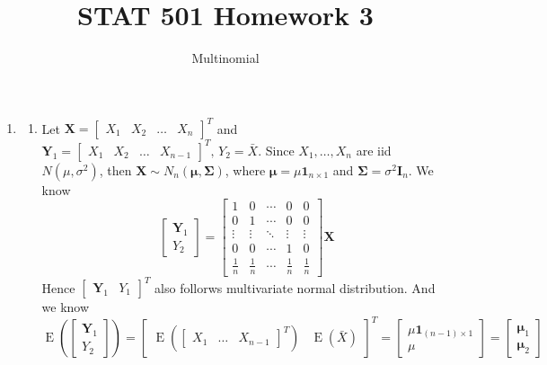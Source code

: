 \documentclass{article}
\DeclareMathOperator{\E}{E}
\begin{document}
	

	
	\title{STAT 501 Homework 3}
	\author{Multinomial}
	\maketitle
	
	\begin{enumerate}[leftmargin = 0 em, label = \arabic*., font = \bfseries]
	\item 
	\begin{enumerate}
		\item 
		Let $\bm X = \begin{bmatrix}
					X_1& X_2& \ldots & X_n
				\end{bmatrix}^T$ and $\bm Y_1 = \begin{bmatrix}
					X_1 & X_2 & \ldots & X_{n-1}
				\end{bmatrix}^T,\, Y_2 = \bar{X}$. Since $X_1, \ldots ,X_n$ are iid $N(\mu, \sigma^2)$, then $\bm X \sim N_n(\bm \mu, \bm \Sigma)$, where $\bm \mu = \mu \bm 1_{n\times 1}$ and $\bm \Sigma = \sigma^2 \bm I_n$. We know
				\[\begin{bmatrix}
					\bm Y_1\\
					Y_2
				\end{bmatrix} = \begin{bmatrix}
					1 & 0 & \cdots & 0 & 0\\
					0 & 1 & \cdots & 0 & 0 \\
					\vdots & \vdots & \ddots & \vdots & \vdots\\
					0 & 0 & \cdots & 1 & 0\\
					\frac{1}{n} & \frac{1}{n} & \cdots & \frac{1}{n} & \frac{1}{n}
				\end{bmatrix} \bm X\]
				Hence $\begin{bmatrix}
					\bm Y_1 & Y_1
				\end{bmatrix}^T$ also follorws multivariate normal distribution. And we know 
				\[\E\left(\begin{bmatrix}
					\bm Y_1\\
					Y_2
				\end{bmatrix}\right) = \begin{bmatrix}
					\E\left(\begin{bmatrix}
											X_1 & \ldots & X_{n-1}
										\end{bmatrix}^T\right)&
					\E(\bar{X})
				\end{bmatrix}^T = \begin{bmatrix}
					\mu \bm 1_{(n-1)\times 1}\\
					\mu
				\end{bmatrix} = \begin{bmatrix}
					\bm \mu_1\\
					\bm \mu_2
				\end{bmatrix}\]


\end{enumerate}
\end{enumerate}
\end{document}

